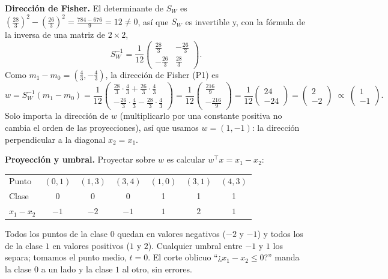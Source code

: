 \documentclass[11pt, letterpaper]{article}
\begin{document}
\textbf{Dirección de Fisher.} El determinante de $S_W$ es $\left(\frac{28}{3}\right)^2 - \left(\frac{26}{3}\right)^2 = \frac{784 - 676}{9} = 12 \neq 0$, así que $S_W$ es invertible y, con la fórmula de la inversa de una matriz de $2 \times 2$,
\[
    S_W^{-1} = \frac{1}{12}\begin{pmatrix} \frac{28}{3} & -\frac{26}{3} \\[2pt] -\frac{26}{3} & \frac{28}{3} \end{pmatrix}.
\]
Como $m_1 - m_0 = \left(\frac43, -\frac43\right)$, la dirección de Fisher (P1) es
\[
    w = S_W^{-1}(m_1 - m_0)
      = \frac{1}{12}\begin{pmatrix} \frac{28}{3}\cdot\frac43 + \frac{26}{3}\cdot\frac43 \\[2pt] -\frac{26}{3}\cdot\frac43 - \frac{28}{3}\cdot\frac43 \end{pmatrix}
      = \frac{1}{12}\begin{pmatrix} \frac{216}{9} \\[2pt] -\frac{216}{9} \end{pmatrix}
      = \frac{1}{12}\begin{pmatrix} 24 \\ -24 \end{pmatrix}
      = \begin{pmatrix} 2 \\ -2 \end{pmatrix} \;\propto\; \begin{pmatrix} 1 \\ -1 \end{pmatrix}.
\]
Solo importa la dirección de $w$ (multiplicarlo por una constante positiva no cambia el orden de las proyecciones), así que usamos $w = (1, -1)$: la dirección perpendicular a la diagonal $x_2 = x_1$.

\textbf{Proyección y umbral.} Proyectar sobre $w$ es calcular $w^\top x = x_1 - x_2$:

\begin{center}
\begin{tabular}{lcccccc}
\toprule
Punto & $(0,1)$ & $(1,3)$ & $(3,4)$ & $(1,0)$ & $(3,1)$ & $(4,3)$ \\
Clase & 0 & 0 & 0 & 1 & 1 & 1 \\
$x_1 - x_2$ & $-1$ & $-2$ & $-1$ & $1$ & $2$ & $1$ \\
\bottomrule
\end{tabular}
\end{center}

Todos los puntos de la clase $0$ quedan en valores negativos ($-2$ y $-1$) y todos los de la clase $1$ en valores positivos ($1$ y $2$). Cualquier umbral entre $-1$ y $1$ los separa; tomamos el punto medio, $t = 0$. El corte oblicuo ``¿$x_1 - x_2 \le 0$?'' manda la clase $0$ a un lado y la clase $1$ al otro, sin errores.
\end{document}
